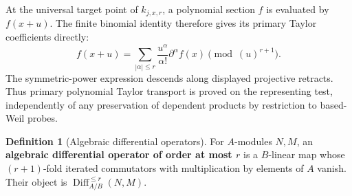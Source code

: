 \documentclass[11pt,a4paper]{article}
\numberwithin{algorithm}{section}
\numberwithin{equation}{section}
\theoremstyle{definition}
\newtheorem{definition}[definition]{Definition}
\theoremstyle{remark}
\theoremstyle{plain}
\theoremstyle{definition}
\theoremstyle{plain}
\begin{document}
At the universal target point of $k_{j,x,r}$, a polynomial
section $f$ is evaluated by $f(x+u)$.  The finite binomial identity
therefore gives its primary Taylor coefficients directly:
\begin{equation}\label{eq:primary-polynomial-taylor}
 f(x+u)=\sum_{|\alpha|\le r}
       \frac{u^\alpha}{\alpha!}\partial^\alpha f(x)
       \pmod{(u)^{r+1}}.
\end{equation}
The symmetric-power expression descends along displayed projective
retracts.  Thus primary polynomial Taylor transport is proved on the
representing test, independently of any preservation of dependent
products by restriction to based-Weil probes.

\begin{definition}[Algebraic differential operators]\label{def:algebraic-operators}
For $A$-modules $N,M$, an \textbf{algebraic differential operator
of order at most $r$} is a $B$-linear map whose $(r+1)$-fold iterated
commutators with multiplication by elements of $A$ vanish. Their
object is $\operatorname{Diff}_{A/B}^{\le r}(N,M)$.
\end{definition}
\end{document}

